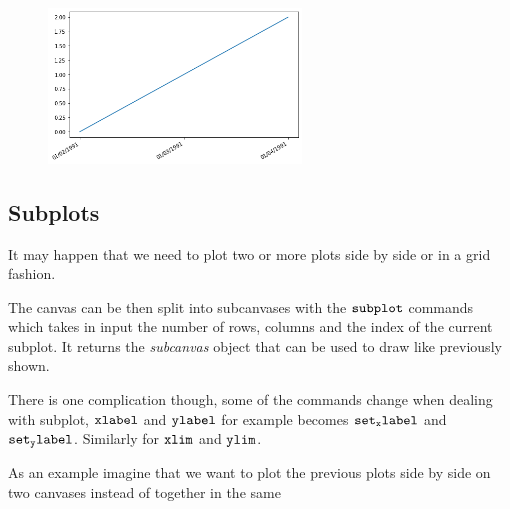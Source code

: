 \begin{figure}[h]
	\centering
	\includegraphics[width=0.6\textwidth]{figures/matplotlib_23_0.png}
\end{figure}

\subsection{Subplots}\label{subplots}

It may happen that we need to plot two or more plots side by side or in
a grid fashion.

The canvas can be then split into subcanvases with the \(\tt{subplot}\)
commands which takes in input the number of rows, columns and the index
of the current subplot. It returns the \emph{subcanvas} object that can
be used to draw like previously shown.

There is one complication though, some of the commands change when
dealing with subplot, \(\tt{xlabel}\) and \(\tt{ylabel}\) for example
becomes \(\tt{set_xlabel}\) and \(\tt{set_ylabel}\). Similarly for
\(\tt{xlim}\) and \(\tt{ylim}\).

As an example imagine that we want to plot the previous plots side by
side on two canvases instead of together in the same

